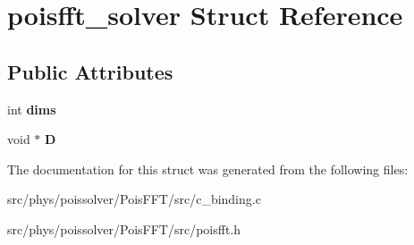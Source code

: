 \hypertarget{structpoisfft__solver}{}\section{poisfft\+\_\+solver Struct Reference}
\label{structpoisfft__solver}
\subsection*{Public Attributes}
\begin{DoxyCompactItemize}
\item 
int {\bfseries dims}\hypertarget{structpoisfft__solver_af0f4b0de4b99911e7d7d28dec35bdb57}{}\label{structpoisfft__solver_af0f4b0de4b99911e7d7d28dec35bdb57}

\item 
void $\ast$ {\bfseries D}\hypertarget{structpoisfft__solver_a4d99d60c795f452686220dea04da3cae}{}\label{structpoisfft__solver_a4d99d60c795f452686220dea04da3cae}

\end{DoxyCompactItemize}


The documentation for this struct was generated from the following files\+:\begin{DoxyCompactItemize}
\item 
src/phys/poissolver/\+Pois\+F\+F\+T/src/c\+\_\+binding.\+c\item 
src/phys/poissolver/\+Pois\+F\+F\+T/src/poisfft.\+h\end{DoxyCompactItemize}
